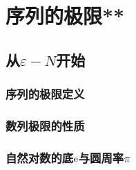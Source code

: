 \chapter{序列的极限**}
\section{从\texorpdfstring{\(\varepsilon-N\)}s开始}
\subsection{序列的极限定义}
\clearpage
\subsection{数列极限的性质}
\clearpage
\subsection{自然对数的底\texorpdfstring{$\mathrm{e}$}e与圆周率\texorpdfstring{$\pi$}e}
\clearpage

